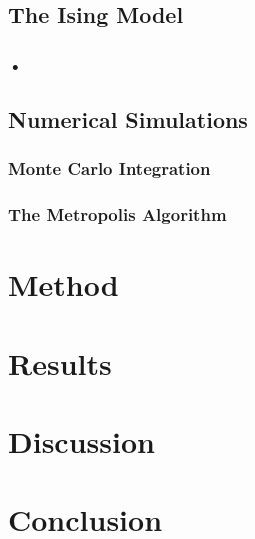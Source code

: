 \documentclass[nofootinbib,reprint,english]{revtex4-1}
\begin{document}
\subsection{The Ising Model}
\subsubsection{•}



\subsection{Numerical Simulations}
\subsubsection{Monte Carlo Integration}
\subsubsection{The Metropolis Algorithm}



















\clearpage
\section{Method}
\section{Results}
\section{Discussion}
\section{Conclusion}





\end{document}
